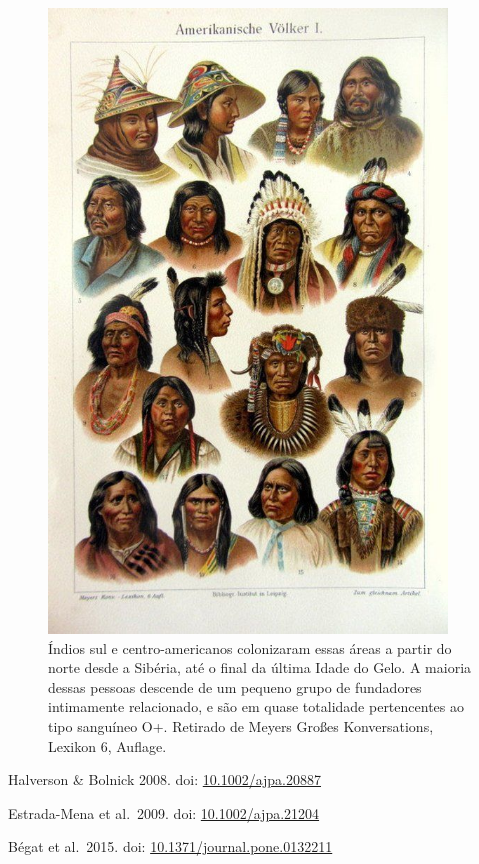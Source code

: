 \documentclass[
]{book}
\begin{document}
\begin{figure}

{\centering \includegraphics[width=400px]{figs/amerindios} 

}

\caption{Índios sul e centro-americanos colonizaram essas áreas a partir do norte desde a Sibéria, até o final da última Idade do Gelo. A maioria dessas pessoas descende de um pequeno grupo de fundadores intimamente relacionado, e são em quase totalidade pertencentes ao tipo sanguíneo O+. Retirado de Meyers Großes Konversations, Lexikon 6, Auflage.}\label{fig:amerindios}
\end{figure}

Halverson \& Bolnick 2008. doi: \href{https://doi.org/10.1002/ajpa.20887}{10.1002/ajpa.20887}

Estrada-Mena et al.~2009. doi: \href{https://doi.org/10.1002/ajpa.20887}{10.1002/ajpa.21204}

Bégat et al.~2015. doi: \href{https://doi.org/10.1002/ajpa.20887}{10.1371/journal.pone.0132211}
\end{document}

